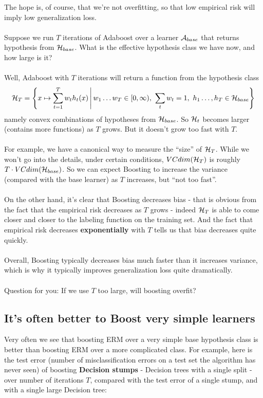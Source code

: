 The hope is, of course, that we're not overfitting, so that low empirical risk
will imply low generalization loss. 
\\~\\
Suppose we run $T$ iterations of Adaboost 
over a learner $\mathcal{A}_{base}$ that returns hypothesis from $\mathcal{H}_{base}$. 
What is the effective hypothesis class we have now, and how large is it?
\\~\\
Well, Adaboost with $T$ iterations will return a function from the hypothesis class  
\[
  \mathcal{H}_T = \left\{ x\mapsto \sum_{t=1}^Tw_t h_t(x) \,
  \Bigg| \,
w_1\ldots w_T\in[0,\infty),\,\, \sum_t w_t=1,\,\,
h_1\ldots,h_T\in\mathcal{H}_{base}\right\}
\]
namely convex combinations of hypotheses from $\mathcal{H}_{base}$.
So $\mathcal{H}_t$ becomes larger (contains more functions) as $T$ grows. But it 
doesn't grow too fast with $T$. 
\\~\\
For example, we have a canonical way to measure the ``size'' of $\mathcal{H}_T$.
While we won't go into the details, under certain conditions,
$VCdim(\mathcal{H}_T)$ is roughly $T\cdot VCdim(\mathcal{H}_{base})$. 
So we can expect Boosting to increase the variance (compared with the base
learner) as $T$ increases, but ``not too fast''. 
\\~\\
On the other hand, it's clear that Boosting decreases bias - that is obvious
from the fact that the empirical risk decreases as $T$ grows - indeed 
$\mathcal{H}_T$ is able to come closer and closer to the labeling function on the
training set. And the fact that empirical risk decreases {\bf exponentially} with 
$T$ tells us that bias decreases quite quickly.
\\~\\
Overall, Boosting typically decreases bias much faster than it increases
variance, which is why it typically improves generalization loss quite
dramatically.
\\~\\
Question for you: If we use $T$ too large, will boosting overfit? 


\subsection{It's often better to Boost very simple learners}
Very often we see that boosting ERM over 
a very simple base hypothesis class is better than boosting ERM over a
more complicated class. 
For example, here is the test error (number of misclassification errors on a test set
the algorithm has never seen) of boosting {\bf
Decision stumps} - Decision trees with a single split - over number of
iterations $T$, compared with the test error of a single stump, and with a
single large Decision tree:


